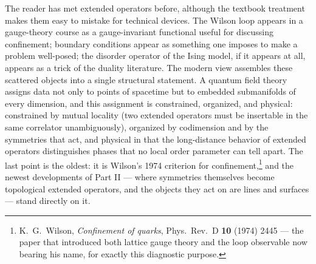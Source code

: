 \noin The reader has met extended operators before, although the textbook
treatment makes them easy to mistake for technical devices. The Wilson loop
appears in a gauge-theory course as a gauge-invariant functional useful for
discussing confinement; boundary conditions appear as something one imposes
to make a problem well-posed; the disorder operator of the Ising model, if
it appears at all, appears as a trick of the duality literature. The modern
view assembles these scattered objects into a single structural statement.
A quantum field theory assigns data not only to points of spacetime but to
embedded submanifolds of every dimension, and this assignment is constrained,
organized, and physical: constrained by mutual locality (two extended
operators must be insertable in the same correlator unambiguously),
organized by codimension and by the symmetries that act, and physical in
that the long-distance behavior of extended operators distinguishes phases
that no local order parameter can tell apart. The last point is the oldest:
it is Wilson's 1974 criterion for confinement,\footnote{K.~G.~Wilson,
\emph{Confinement of quarks}, Phys.\ Rev.\ D \textbf{10} (1974) 2445 ---
the paper that introduced both lattice gauge theory and the loop
observable now bearing his name, for exactly this diagnostic purpose.} and
the newest developments of Part II --- where symmetries themselves become
topological extended operators, and the objects they act on are lines and
surfaces --- stand directly on it.

